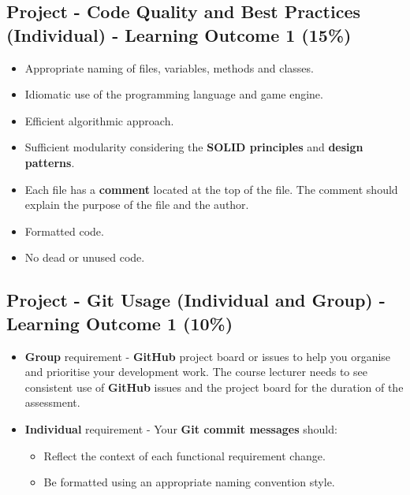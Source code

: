 \documentclass{article}
\begin{document}
\subsection*{Project - Code Quality and Best Practices (Individual) - Learning Outcome 1 (15\%)}
\begin{itemize}
    \item Appropriate naming of files, variables, methods and classes.
    \item Idiomatic use of the programming language and game engine.
    \item Efficient algorithmic approach.
    \item Sufficient modularity considering the \textbf{SOLID principles} and \textbf{design patterns}.
    \item Each file has a \textbf{comment} located at the top of the file. The comment should explain the purpose of the file and the author.
    \item Formatted code.
    \item No dead or unused code.
\end{itemize} 

\subsection*{Project - Git Usage (Individual and Group) - Learning Outcome 1 (10\%)}
\begin{itemize}
	\item \textbf{Group} requirement - \textbf{GitHub} project board or issues to help you organise and prioritise your development work. The course lecturer needs to see consistent use of \textbf{GitHub} issues and the project board for the duration of the assessment. 
	\item \textbf{Individual} requirement - Your \textbf{Git commit messages} should:
    \begin{itemize}
      \item Reflect the context of each functional requirement change.
      \item Be formatted using an appropriate naming convention style. 
    \end{itemize}
\end{itemize}
\end{document}
